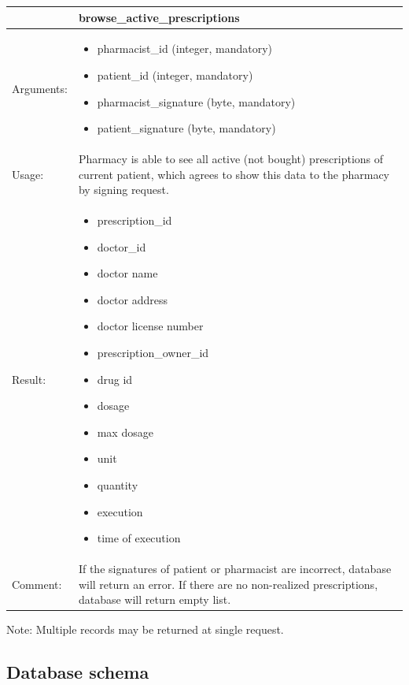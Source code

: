 
    \begin{longtable}{| p{6cm} | p{7.75cm} |}
    \hline
     & browse\_active\_prescriptions \\ \hline
    Arguments: &  \begin{itemize}
    	\item pharmacist\_id (integer, mandatory)
		\item patient\_id (integer, mandatory)
		\item pharmacist\_signature (byte, mandatory)
		\item patient\_signature (byte, mandatory)
	\end{itemize}     \\ \hline
    Usage: & Pharmacy is able to see all active (not bought) prescriptions of current patient, which agrees to show this data to the pharmacy by signing request. \\ \hline
    Result: & \begin{itemize}
    	\item prescription\_id
    	\item doctor\_id
    	\item doctor name
    	\item doctor address
    	\item doctor license number
    	\item prescription\_owner\_id
    	\item drug id
    	\item dosage
    	\item max dosage
    	\item unit
    	\item quantity
    	\item execution
    	\item time of execution
	\end{itemize}     \\ \hline	
		Comment: & If the signatures of patient or pharmacist are incorrect, database will return an error. If there are no non-realized prescriptions, database will return empty list.\\ \hline
    \end{longtable}
Note: Multiple records may be returned at single request.

\subsection{Database schema}

